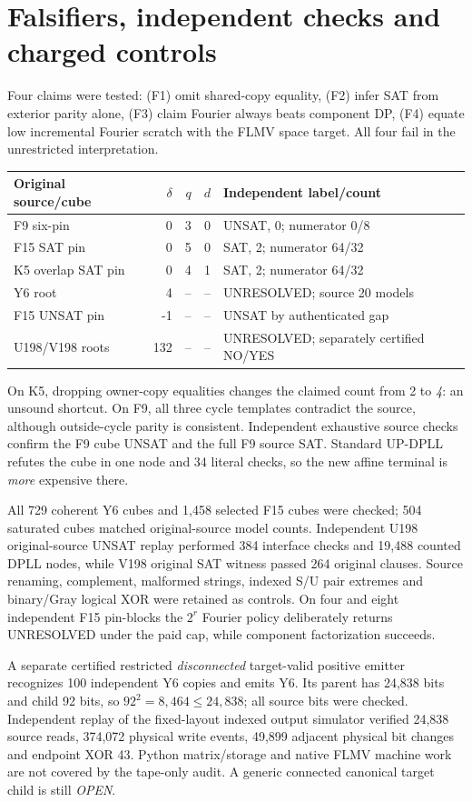 \documentclass[11pt]{article}
\begin{document}
\section{Falsifiers, independent checks and charged controls}
Four claims were tested: (F1) omit shared-copy equality, (F2) infer SAT from exterior parity alone, (F3) claim Fourier always beats component DP, (F4) equate low incremental Fourier scratch with the FLMV space target. All four fail in the unrestricted interpretation.

\begin{center}\begin{tabular}{lrrrl}\toprule
Original source/cube & $\delta$ & $q$ & $d$ & Independent label/count\\\midrule
F9 six-pin &0&3&0&UNSAT, 0; numerator 0/8\\
F15 SAT pin &0&5&0&SAT, 2; numerator 64/32\\
K5 overlap SAT pin&0&4&1&SAT, 2; numerator 64/32\\
Y6 root&4&--&--&UNRESOLVED; source 20 models\\
F15 UNSAT pin&-1&--&--&UNSAT by authenticated gap\\
U198/V198 roots&132&--&--&UNRESOLVED; separately certified NO/YES\\\bottomrule
\end{tabular}\end{center}
On K5, dropping owner-copy equalities changes the claimed count from 2 to \emph{4}: an unsound shortcut. On F9, all three cycle templates contradict the source, although outside-cycle parity is consistent. Independent exhaustive source checks confirm the F9 cube UNSAT and the full F9 source SAT. Standard UP-DPLL refutes the cube in one node and 34 literal checks, so the new affine terminal is \emph{more} expensive there.

All 729 coherent Y6 cubes and 1,458 selected F15 cubes were checked; 504 saturated cubes matched original-source model counts. Independent U198 original-source UNSAT replay performed 384 interface checks and 19,488 counted DPLL nodes, while V198 original SAT witness passed 264 original clauses. Source renaming, complement, malformed strings, indexed S/U pair extremes and binary/Gray logical XOR were retained as controls. On four and eight independent F15 pin-blocks the $2^r$ Fourier policy deliberately returns UNRESOLVED under the paid cap, while component factorization succeeds.

A separate certified restricted \emph{disconnected} target-valid positive emitter recognizes 100 independent Y6 copies and emits Y6. Its parent has 24,838 bits and child 92 bits, so $92^2=8,464\le24,838$; all source bits were checked. Independent replay of the fixed-layout indexed output simulator verified 24,838 source reads, 374,072 physical write events, 49,899 adjacent physical bit changes and endpoint XOR 43. Python matrix/storage and native FLMV machine work are not covered by the tape-only audit. A generic connected canonical target child is still \emph{OPEN}.
\end{document}
